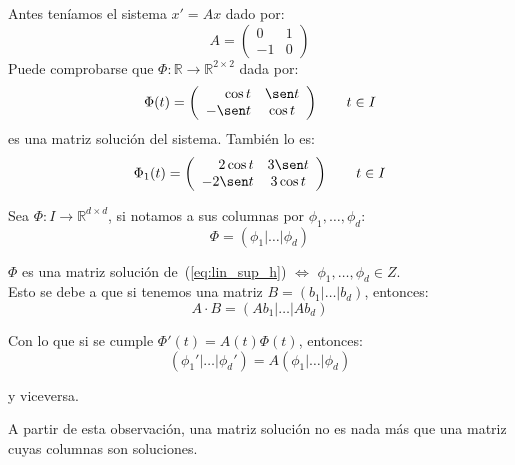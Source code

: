 \begin{ejemplo}
    Antes teníamos el sistema $x' = Ax$ dado por:
    \begin{equation*}
        A = \left(\begin{array}{cc}
                0 & 1 \\
                -1 & 0
        \end{array}\right)
    \end{equation*}
    Puede comprobarse que $\Phi:\mathbb{R}\rightarrow\mathbb{R}^{2\times 2}$ dada por:
    \begin{equation*}
        \Phi(t) = \left(\begin{array}{rc}
                \cos t & \sen t \\
                -\sen t & \cos t
        \end{array}\right) \qquad t\in I
    \end{equation*}
    es una matriz solución del sistema. También lo es:
    \begin{equation*}
        \Phi_1(t) = \left(\begin{array}{rc}
                2\cos t & 3\sen t \\
                -2\sen t & 3\cos t
        \end{array}\right) \qquad t\in I
    \end{equation*}
\end{ejemplo}

\begin{observacion}
    Sea $\Phi:I\rightarrow\mathbb{R}^{d\times d}$, si notamos a sus columnas por $\phi_1,\ldots,\phi_d$:
    \begin{equation*}
        \Phi = (\phi_1|\ldots|\phi_d)
    \end{equation*}

    $\Phi$ es una matriz solución de~(\ref{eq:lin_sup_h}) $\Longleftrightarrow $ $\phi_1,\ldots,\phi_d \in Z$.\\

    Esto se debe a que si tenemos una matriz $B=(b_1|\ldots|b_d)$, entonces:
    \begin{equation*}
        A\cdot B = (Ab_1|\ldots|Ab_d)
    \end{equation*}

    Con lo que si se cumple $\Phi'(t) = A(t)\Phi(t)$, entonces:
    \begin{equation*}
        (\phi_1'|\ldots|\phi_d') = A(\phi_1|\ldots|\phi_d)
    \end{equation*}

    y viceversa.
\end{observacion}
\noindent
A partir de esta observación, una matriz solución no es nada más que una matriz cuyas columnas son soluciones.

